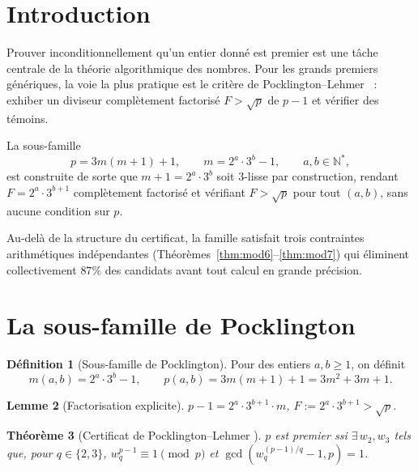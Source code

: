 \documentclass[11pt,a4paper]{article}
\newtheorem{theoreme}{Théorème}[section]
\newtheorem{lemme}[theoreme]{Lemme}
\theoremstyle{definition}
\newtheorem{definition}[theoreme]{Définition}
\theoremstyle{remark}
\newcommand{\N}{\mathbb{N}}
\begin{document}
\section{Introduction}\label{sec:intro}

Prouver inconditionnellement qu'un entier donné est premier est une tâche
centrale de la théorie algorithmique des nombres. Pour les grands premiers
génériques, la voie la plus pratique est le critère de
Pocklington--Lehmer~\cite{Pocklington1914,LehmerPSW1975} : exhiber un
diviseur complètement factorisé $F>\sqrt{p}$ de $p-1$ et vérifier des
témoins.

La sous-famille
\[
  p = 3m(m+1)+1,\qquad m = 2^a\cdot 3^b-1,\qquad a,b\in\N^*,
\]
est construite de sorte que $m+1=2^a\cdot 3^b$ soit $3$-lisse par
construction, rendant $F=2^a\cdot 3^{b+1}$ complètement factorisé et
vérifiant $F>\sqrt{p}$ pour tout $(a,b)$, sans aucune condition sur $p$.

Au-delà de la structure du certificat, la famille satisfait trois
contraintes arithmétiques indépendantes
(Théorèmes~\ref{thm:mod6}--\ref{thm:mod7}) qui éliminent collectivement
$87\%$ des candidats avant tout calcul en grande précision.

\section{La sous-famille de Pocklington}\label{sec:famille}

\begin{definition}[Sous-famille de Pocklington]\label{def:pocklington}
Pour des entiers $a,b\geq 1$, on définit
\[
  m(a,b) = 2^a\cdot 3^b - 1, \qquad
  p(a,b) = 3m(m+1)+1 = 3m^2+3m+1.
\]
\end{definition}

\begin{rigorousbox}
\begin{lemme}[Factorisation explicite]\label{lem:factorisation}
$p - 1 = 2^a\cdot 3^{b+1}\cdot m$, $F := 2^a\cdot 3^{b+1} > \sqrt{p}$.
\end{lemme}
\end{rigorousbox}

\begin{rigorousbox}
\begin{theoreme}[Certificat de Pocklington--Lehmer
\cite{Pocklington1914,LehmerPSW1975}]\label{thm:Pocklington}
$p$ est premier ssi $\exists\,w_2,w_3$ tels que, pour $q\in\{2,3\}$,
$w_q^{p-1}\equiv 1\pmod{p}$ et $\gcd(w_q^{(p-1)/q}-1,p)=1$.
\end{theoreme}
\end{rigorousbox}
\end{document}
